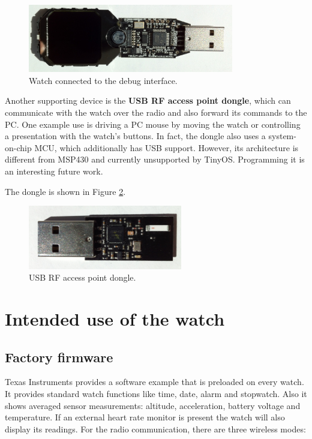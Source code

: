 \begin{figure}[h]
  \centering
  \includegraphics[width=0.8\textwidth]{img/chronos_dongle.jpg}
  \caption{Watch connected to the debug interface.}
  \label{fig:chronos_dongle}
\end{figure}

Another supporting device is the {\bf USB RF access point dongle},
which can communicate with the watch over the radio and also forward
its commands to the PC. One example use is driving a PC mouse by
moving the watch or controlling a presentation with the watch's
buttons. In fact, the dongle also uses a system-on-chip MCU, which
additionally has USB support. However, its architecture is different
from MSP430 and currently unsupported by TinyOS. Programming it is an
interesting future work.

The dongle is shown in Figure \ref{fig:chronos_rfdongle}.

\begin{figure}[h]
  \centering
  \includegraphics[width=0.6\textwidth]{img/chronos_rfdongle.jpg}
  \caption{USB RF access point dongle.}
  \label{fig:chronos_rfdongle}
\end{figure}

\section{Intended use of the watch}

\subsection{Factory firmware}

Texas Instruments provides a software example that is preloaded on every
watch. It provides standard watch functions like time, date, alarm and
stopwatch. Also it shows averaged sensor measurements: altitude,
acceleration, battery voltage and temperature. If an external  heart
rate monitor is present the watch will also display its readings. For
the radio communication, there are three wireless modes:

